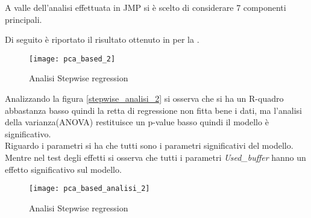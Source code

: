 A valle dell'analisi effettuata in JMP si è scelto di considerare 7 componenti
principali.\\

\clearpage

Di seguito è riportato il risultato ottenuto in  per
la .\\

\begin{figure}[!htbp]
  \centering
  \texttt{[image: pca\_based\_2]}
  \caption{Analisi Stepwise regression}
  \label{pca_based_2}
\end{figure}

\clearpage

Analizzando la figura \ref{stepwise_analisi_2} si osserva che si ha un R-quadro
abbastanza basso quindi la retta di regressione non fitta bene i dati, ma l'analisi
della varianza(ANOVA) restituisce un p-value basso quindi il modello è significativo.\\
Riguardo i parametri si ha che tutti sono i parametri significativi
del modello.\\
Mentre nel test degli effetti si osserva che tutti i parametri \textit{Used\_buffer}
hanno un effetto significativo sul modello.\\

\begin{figure}[!htbp]
  \centering
  \texttt{[image: pca\_based\_analisi\_2]}
  \caption{Analisi Stepwise regression}
  \label{pca_based_analisi_2}
\end{figure}
